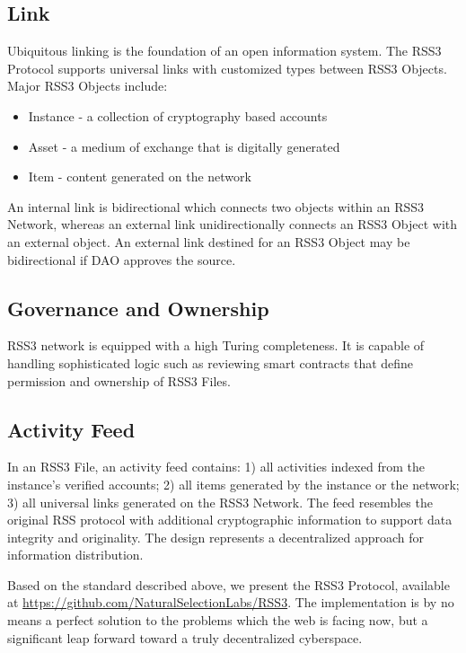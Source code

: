 \subsection{Link}

Ubiquitous linking is the foundation of an open information system. The RSS3 Protocol supports universal links with customized types between RSS3 Objects. Major RSS3 Objects include:

\begin{itemize}
    \item Instance - a collection of cryptography based accounts
    \item Asset - a medium of exchange that is digitally generated
    \item Item - content generated on the network
\end{itemize}

An internal link is bidirectional which connects two objects within an RSS3 Network, whereas an external link unidirectionally connects an RSS3 Object with an external object. An external link destined for an RSS3 Object may be bidirectional if DAO approves the source.

\subsection{Governance and Ownership}

RSS3 network is equipped with a high Turing completeness. It is capable of handling sophisticated logic such as reviewing smart contracts that define permission and ownership of RSS3 Files.

\subsection{Activity Feed}

In an RSS3 File, an activity feed contains: 1) all activities indexed from the instance's verified accounts; 2) all items generated by the instance or the network; 3) all universal links generated on the RSS3 Network. The feed resembles the original RSS protocol with additional cryptographic information to support data integrity and originality. The design represents a decentralized approach for information distribution.

Based on the standard described above, we present the RSS3 Protocol, available at \url{https://github.com/NaturalSelectionLabs/RSS3}. The implementation is by no means a perfect solution to the problems which the web is facing now, but a significant leap forward toward a truly decentralized cyberspace.
